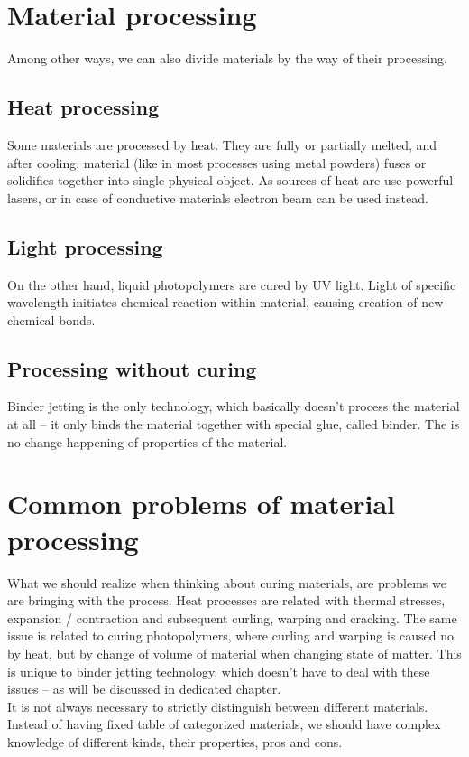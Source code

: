 \documentclass[a4paper]{report}
\begin{document}
\section{Material processing}
Among other ways, we can also divide materials by the way of their processing.
\subsection{Heat processing} Some materials are processed by heat. They are fully or partially melted, and after cooling, material (like in most processes using metal powders) fuses or solidifies together into single physical object. As sources of heat are use powerful lasers, or in case of conductive materials electron beam can be used instead.
\subsection{Light processing}
On the other hand, liquid photopolymers are cured by UV light. Light of specific wavelength initiates chemical reaction within material, causing creation of new chemical bonds.
\subsection{Processing without curing}
Binder jetting is the only technology, which basically doesn’t process the material at all – it only binds the material together with special glue, called binder. The is no change happening of properties of the material.

\section{Common problems of material processing}
What we should realize when thinking about curing materials, are problems we are bringing with the process. Heat processes are related with thermal stresses, expansion / contraction and subsequent curling, warping and cracking. The same issue is related to curing photopolymers, where curling and warping is caused no by heat, but by change of volume of material when changing state of matter. This is unique to binder jetting technology, which doesn’t have to deal with these issues – as will be discussed in dedicated chapter.\\
It is not always necessary to strictly distinguish between different materials. Instead of having fixed table of categorized materials, we should have complex knowledge of different kinds, their properties, pros and cons. 

\tableofcontents
\listoftodos
\end{document}
